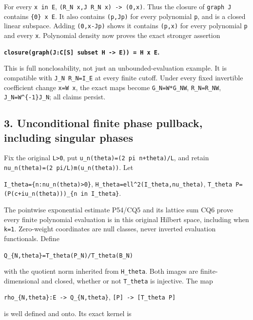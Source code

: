 For every \texttt{x\ in\ E}, \texttt{(R\_N\ x,J\ R\_N\ x)\ -\textgreater{}\ (0,x)}. Thus the closure of \texttt{graph\ J} contains \texttt{\{0\}\ x\ E}. It also contains \texttt{(p,Jp)} for every polynomial \texttt{p}, and is a closed linear subspace. Adding \texttt{(0,x-Jp)} shows it contains \texttt{(p,x)} for every polynomial \texttt{p} and every \texttt{x}. Polynomial density now proves the exact stronger assertion

\textbf{\texttt{closure(graph(J:C{[}S{]}\ subset\ H\ -\textgreater{}\ E))\ =\ H\ x\ E}.}

This is full nonclosability, not just an unbounded-evaluation example. It is compatible with \texttt{J\_N\ R\_N=I\_E} at every finite cutoff. Under every fixed invertible coefficient change \texttt{x=W\ x\textquotesingle{}}, the exact maps become \texttt{G\_N\textquotesingle{}=W*G\_NW}, \texttt{R\_N\textquotesingle{}=R\_NW}, \texttt{J\_N\textquotesingle{}=W\^{}\{-1\}J\_N}; all claims persist.

\subsection{3. Unconditional finite phase pullback, including singular phases}\label{unconditional-finite-phase-pullback-including-singular-phases}

Fix the original \texttt{L\textgreater{}0}, put \texttt{u\_n(theta)=(2\ pi\ n+theta)/L}, and retain \texttt{nu\_n(theta)=(2\ pi/L)m(u\_n(theta))}. Let

\texttt{I\_theta=\{n:nu\_n(theta)\textgreater{}0\}}, \texttt{H\_theta=ell\^{}2(I\_theta,nu\_theta)}, \texttt{T\_theta\ P=(P(c+iu\_n(theta)))\_\{n\ in\ I\_theta\}}.

The pointwise exponential estimate P54/CQ5 and its lattice sum CQ6 prove every finite polynomial evaluation is in this original Hilbert space, including when \texttt{k=1}. Zero-weight coordinates are null classes, never inverted evaluation functionals. Define

\texttt{Q\_\{N,theta\}=T\_theta(P\_N)/T\_theta(B\_N)}

with the quotient norm inherited from \texttt{H\_theta}. Both images are finite-dimensional and closed, whether or not \texttt{T\_theta} is injective. The map

\texttt{rho\_\{N,theta\}:E\ -\textgreater{}\ Q\_\{N,theta\}}, \texttt{{[}P{]}\ -\textgreater{}\ {[}T\_theta\ P{]}}

is well defined and onto. Its exact kernel is

